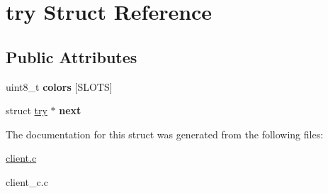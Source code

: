 \hypertarget{structtry}{}\section{try Struct Reference}
\label{structtry}
\subsection*{Public Attributes}
\begin{DoxyCompactItemize}
\item 
\hypertarget{structtry_aae18012ca9487240c21c68fc87af0d37}{}\label{structtry_aae18012ca9487240c21c68fc87af0d37} 
uint8\+\_\+t {\bfseries colors} \mbox{[}S\+L\+O\+TS\mbox{]}
\item 
\hypertarget{structtry_a4bd5825a0f7a5707c28adfbb7b761ed1}{}\label{structtry_a4bd5825a0f7a5707c28adfbb7b761ed1} 
struct \hyperlink{structtry}{try} $\ast$ {\bfseries next}
\end{DoxyCompactItemize}


The documentation for this struct was generated from the following files\+:\begin{DoxyCompactItemize}
\item 
\hyperlink{client_8c}{client.\+c}\item 
client\+\_\+c.\+c\end{DoxyCompactItemize}
